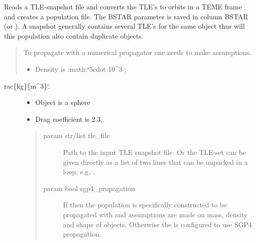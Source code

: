 \documentclass[letterpaper,10pt,english]{sphinxmanual}
\begin{document}
\begin{fulllineitems}
\label{\detokenize{modules/population_library:population_library.tle_snapshot}}
Reads a TLE-snapshot file and converts the TLE’s to orbits in a TEME frame and creates a population file. The BSTAR parameter is saved in column BSTAR (or \sphinxcode{\sphinxupquote{\_objs{[}:,12}}). A snapshot generally contains several TLE’s for the same object thus will this population also contain duplicate objects.
\begin{quote}

To propagate with a numerical propagator one needs to make assumptions.
\begin{itemize}
\item {} 
Density is :math:{\color{red}\bfseries{}{}`}5cdot 10\textasciicircum{}3 ;

\end{itemize}
\end{quote}
\begin{description}
\item[{rac\{kg\}\{m\textasciicircum{}3\}{}`.}] \leavevmode\begin{itemize}
\item {} 
Object is a sphere

\item {} 
Drag coefficient is 2.3.

\end{itemize}
\begin{quote}\begin{description}
\item[{param str/list tle\_file}] \leavevmode
Path to the input TLE snapshot file. Or the TLE-set can be given directly as a list of two lines that can be unpacked in a loop, e.g. .

\item[{param bool sgp4\_propagation}] \leavevmode
If  then the population is specifically constructed to be propagated with {\hyperref[\detokenize{modules/propagator_orekit:propagator_orekit.PropagatorOrekit}]{}} and assumptions are made on mass, density and shape of objects. Otherwise the {\hyperref[\detokenize{modules/space_object:space_object.SpaceObject}]{}} is configured to use SGP4 propagation.


\end{description}
\end{quote}
\end{description}
\end{fulllineitems}
\end{document}
